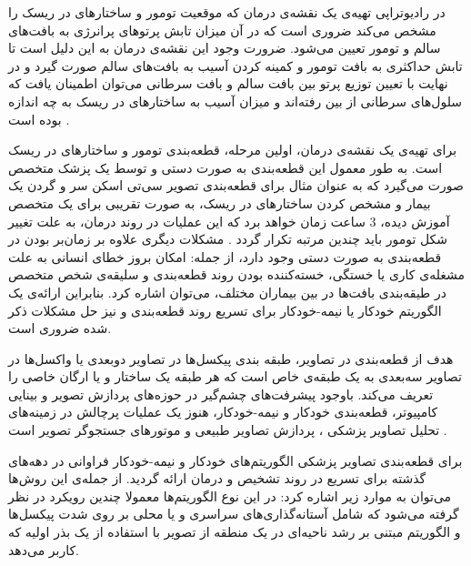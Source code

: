 در رادیوتراپی تهیه‌ی یک نقشه‌ی درمان که موقعیت تومور و ساختارهای در ریسک را مشخص می‌کند ضروری است که در آن میزان تابش پرتوهای پرانرژی به بافت‌های سالم و تومور تعیین می‌شود. ضرورت وجود این نقشه‌ی درمان به این دلیل است تا تابش حداکثری به بافت تومور و کمینه کردن آسیب به بافت‌های سالم صورت گیرد و در نهایت با تعیین توزیع پرتو بین بافت سالم و بافت سرطانی می‌توان اطمینان یافت که سلول‌های سرطانی از بین رفته‌اند و میزان آسیب به ساختارهای در ریسک به چه اندازه بوده است .

برای تهیه‌ی یک نقشه‌ی درمان، اولین مرحله، قطعه‌بندی تومور و ساختار‌های در ریسک است. به طور معمول این قطعه‌بندی به صورت دستی و توسط یک پزشک متخصص صورت می‌گیرد که به عنوان مثال برای قطعه‌بندی تصویر سی‌تی اسکن سر و گردن یک بیمار و مشخص کردن ساختارهای در ریسک، به صورت تقریبی برای یک متخصص آموزش دیده، 3 ساعت زمان خواهد برد  که این عملیات در روند درمان، به علت تغییر شکل تومور باید چندین مرتبه تکرار گردد . مشکلات دیگری علاوه بر زمان‌بر بودن در قطعه‌بندی به صورت دستی وجود دارد، از جمله: امکان بروز خطای انسانی به علت مشغله‌ی کاری یا خستگی، خسته‌کننده بودن روند قطعه‌بندی و سلیقه‌ی شخص متخصص در طیقه‌بندی بافت‌ها در بین بیماران مختلف، می‌توان اشاره کرد. بنابراین ارائه‌ی یک الگوریتم خودکار یا نیمه-خودکار برای تسریع روند قطعه‌بندی و نیز حل مشکلات ذکر شده ضروری است. 


هدف از قطعه‌بندی در تصاویر، طبقه بندی پیکسل‌ها  در تصاویر دوبعدی  یا واکسل‌ها  در تصاویر سه‌بعدی  به یک طبقه‌ی خاص است که هر طبقه یک ساختار و یا ارگان خاصی را تعریف می‌کند. باوجود پیشرفت‌های چشم‌گیر در حوزه‌های پردازش تصویر   و بینایی کامپیوتر، قطعه‌بندی خودکار و نیمه-خودکار، هنوز یک عملیات پرچالش در زمینه‌های تحلیل تصاویر پزشکی  ، پردازش تصاویر طبیعی  و موتورهای جستجوگر تصویر است . 

برای قطعه‌بندی تصاویر پزشکی الگوریتم‌های خودکار و نیمه-خودکار فراوانی در دهه‌های گذشته برای تسریع در روند تشخیص و درمان ارائه گردید. از جمله‌ی این روش‌ها می‌توان به موارد زیر اشاره کرد:
   در این نوع الگوریتم‌ها معمولا چندین رویکرد در نظر گرفته می‌شود که شامل آستانه‌گذاری‌های سراسری و یا محلی  بر روی شدت پیکسل‌ها و الگوریتم مبتنی بر رشد ناحیه‌ای  در یک منطقه از تصویر با استفاده از یک بذر  اولیه که کاربر می‌دهد.
 
